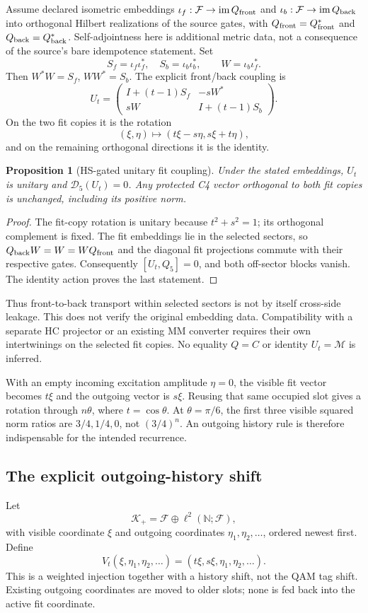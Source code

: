 \documentclass[11pt,a4paper]{article}
\newtheorem{proposition}{Proposition}
\begin{document}
Assume declared isometric embeddings
$\iota_f:\mathcal F\to\operatorname{im}Q_{\rm front}$ and
$\iota_b:\mathcal F\to\operatorname{im}Q_{\rm back}$ into orthogonal
Hilbert realizations of the source gates, with
$Q_{\rm front}=Q_{\rm front}^*$ and $Q_{\rm back}=Q_{\rm back}^*$.
Self-adjointness here is additional metric data, not a consequence of
the source's bare idempotence statement. Set
\[
 S_f=\iota_f\iota_f^*,\quad S_b=\iota_b\iota_b^*,
 \qquad W=\iota_b\iota_f^*.
\]
Then $W^*W=S_f$, $WW^*=S_b$. The explicit front/back coupling is
\[
 U_t=
 \begin{pmatrix}
 I+(t-1)S_f&-sW^*\\
 sW&I+(t-1)S_b
 \end{pmatrix}.
\]
On the two fit copies it is the rotation
\[
 (\xi,\eta)\longmapsto(t\xi-s\eta,s\xi+t\eta),
\]
and on the remaining orthogonal directions it is the identity.

\begin{proposition}[HS-gated unitary fit coupling]
\label{prop:hs-gated-unitary-coupling}
Under the stated embeddings, $U_t$ is unitary and
$\mathcal D_5(U_t)=0$. Any protected C4 vector orthogonal to both fit
copies is unchanged, including its positive norm.
\end{proposition}
\begin{proof}
The fit-copy rotation is unitary because $t^2+s^2=1$; its orthogonal
complement is fixed. The fit embeddings lie in the selected sectors,
so $Q_{\rm back}W=W=WQ_{\rm front}$ and the diagonal fit projections
commute with their respective gates. Consequently $[U_t,Q_5]=0$,
and both off-sector blocks vanish. The identity action proves the last
statement.
\end{proof}
Thus front-to-back transport within selected sectors is not by itself
cross-side leakage. This does not verify the original embedding data.
Compatibility with a separate HC projector or an existing MM converter
requires their own intertwinings on the selected fit copies. No equality
$Q=C$ or identity $U_t=\mathcal M$ is inferred.

With an empty incoming excitation amplitude $\eta=0$, the visible fit
vector becomes $t\xi$ and the outgoing vector is $s\xi$. Reusing that
same occupied slot gives a rotation through $n\theta$, where
$t=\cos\theta$. At $\theta=\pi/6$, the first three visible squared
norm ratios are $3/4,1/4,0$, not $(3/4)^n$. An outgoing history rule
is therefore indispensable for the intended recurrence.

\subsection{The explicit outgoing-history shift}
Let
\[
 \mathcal K_+=\mathcal F\oplus\ell^2(\mathbb N;\mathcal F),
\]
with visible coordinate $\xi$ and outgoing coordinates
$\eta_1,\eta_2,\ldots$, ordered newest first. Define
\[
 V_t(\xi,\eta_1,\eta_2,\ldots)
 =(t\xi,s\xi,\eta_1,\eta_2,\ldots).
\]
This is a weighted injection together with a history shift, not the
QAM tag shift. Existing outgoing coordinates are moved to older slots;
none is fed back into the active fit coordinate.
\end{document}
